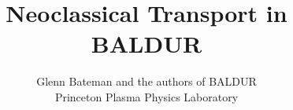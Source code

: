 %
%
%
%
%
%

\oddsidemargin 0pt \textwidth 6.5in

\title{Neoclassical Transport in BALDUR}
\author{Glenn Bateman and the authors of BALDUR \\
        Princeton Plasma Physics Laboratory}


\maketitle                 %

